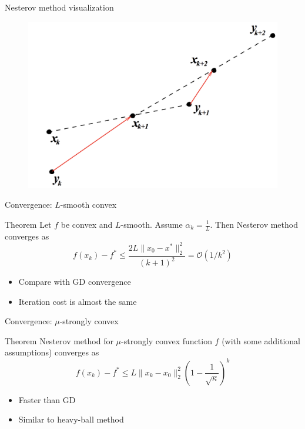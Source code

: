 \documentclass{beamer}
\begin{document}
\begin{frame}{Nesterov method visualization}

\begin{figure}
\centering
\includegraphics[scale=0.3]{nesterov_plot}
\end{figure}



\end{frame}

\begin{frame}{Convergence: $L$-smooth convex}
\begin{block}{Theorem}
Let $f$ be convex and $L$-smooth. Assume $\alpha_k = \frac{1}{L}$. Then Nesterov method converges as
\[
f(x_k) - f^* \leq \frac{2L \|x_0 - x^*\|_2^2}{(k+1)^2} = \mathcal{O}(1/k^2)
\]
\end{block}
\begin{itemize}
\item Compare with GD convergence
\item Iteration cost is almost the same
\end{itemize}
\end{frame}

\begin{frame}{Convergence: $\mu$-strongly convex}
\begin{block}{Theorem}
Nesterov method for $\mu$-strongly convex function $f$ (with some additional assumptions) converges as 
\[
f(x_k) - f^* \leq L\|x_k - x_0\|_2^2 \left(1 - \frac{1}{\sqrt{\kappa}} \right)^k
\]
\end{block}

\begin{itemize}
\item Faster than GD
\item Similar to heavy-ball method
\end{itemize}
\end{frame}
\end{document}
